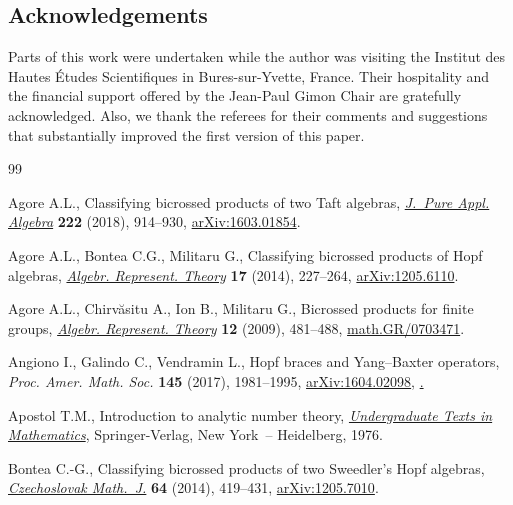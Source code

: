 \documentclass[pdftex]{sigma}
\numberwithin{equation}{section}
\begin{document}
\subsection*{Acknowledgements}

Parts of this work were undertaken while the author was visiting the Institut des Hautes \'{E}tudes Scientifiques in Bures-sur-Yvette, France. Their hospitality and the financial support offered by the Jean-Paul Gimon Chair are gratefully acknowledged. Also, we thank the referees for their comments and suggestions that substantially improved the first version of this paper.

\begin{thebibliography}{99}
\footnotesize\itemsep=0pt

Agore A.L., Classifying bicrossed products of two {T}aft algebras,
 \href{https://doi.org/10.1016/j.jpaa.2017.05.014}{\textit{J.~Pure Appl. Algebra}} \textbf{222} (2018), 914--930,
 \href{https://arxiv.org/abs/1603.01854}{arXiv:1603.01854}.

Agore A.L., Bontea C.G., Militaru G., Classifying bicrossed products of {H}opf
 algebras, \href{https://doi.org/10.1007/s10468-012-9396-5}{\textit{Algebr. Represent. Theory}} \textbf{17} (2014), 227--264,
 \href{https://arxiv.org/abs/1205.6110}{arXiv:1205.6110}.

Agore A.L., Chirv\u{a}situ A., Ion B., Militaru G., Bicrossed products for
 finite groups, \href{https://doi.org/10.1007/s10468-009-9145-6}{\textit{Algebr. Represent. Theory}} \textbf{12} (2009),
 481--488, \href{https://arxiv.org/abs/math.GR/0703471}{math.GR/0703471}.

Angiono I., Galindo C., Vendramin L., Hopf braces and {Y}ang--{B}axter
 operators, \textit{Proc. Amer. Math. Soc.} \textbf{145} (2017), 1981--1995,
 \href{https://arxiv.org/abs/#2}{arXiv:1604.02098}, \href{https://doi.org/10.1090/proc/13395}.

Apostol T.M., Introduction to analytic number theory, \href{https://doi.org/10.1007/978-1-4757-5579-4}{\textit{Undergraduate Texts in Mathematics}}, Springer-Verlag, New York~-- Heidelberg, 1976.

Bontea C.-G., Classifying bicrossed products of two {S}weedler's {H}opf
 algebras, \href{https://doi.org/10.1007/s10587-014-0109-6}{\textit{Czechoslovak Math.~J.}} \textbf{64} (2014), 419--431,
 \href{https://arxiv.org/abs/1205.7010}{arXiv:1205.7010}.


\end{thebibliography}
\end{document}
